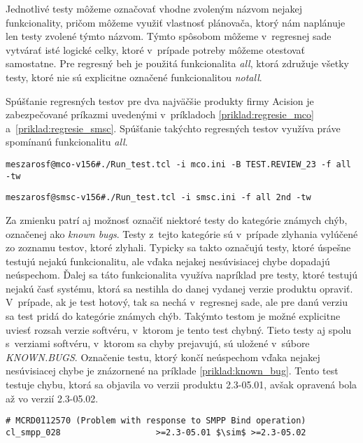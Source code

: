 Jednotlivé testy môžeme označovať vhodne zvoleným názvom nejakej 
funkcionality, pričom môžeme využiť vlastnosť plánovača, ktorý nám 
naplánuje len testy zvolené týmto názvom. Týmto spôsobom môžeme 
v~regresnej sade vytvárať isté logické celky, ktoré v~prípade potreby 
môžeme otestovať samostatne. Pre regresný beh je použitá funkcionalita 
\emph{all}, ktorá združuje všetky testy, ktoré nie sú explicitne označené 
funkcionalitou \emph{notall}. 

Spúšťanie regresných testov pre dva najväčšie produkty firmy Acision 
je zabezpečované príkazmi uvedenými v~príkladoch \ref{priklad:regresie_mco}
a~\ref{priklad:regresie_smsc}. Spúšťanie takýchto regresných testov využíva
práve spomínanú funkcionalitu \emph{all}.

\begin{lstlisting}[caption=Spúšťanie regresných testov v~produkte MCO
,label=priklad:regresie_mco]
meszarosf@mco-v156#./Run_test.tcl -i mco.ini -B TEST.REVIEW_23 -f all -tw
\end{lstlisting}

\begin{lstlisting}[caption=Spúšťanie regresných testov v~produkte SMSCv5
,label=priklad:regresie_smsc]
meszarosf@smsc-v156#./Run_test.tcl -i smsc.ini -f all 2nd -tw
\end{lstlisting}

Za zmienku patrí aj možnosť označiť niektoré testy do kategórie 
známych chýb, označenej ako \emph{known bugs}. 
Testy z~tejto kategórie sú v~prípade zlyhania vylúčené zo zoznamu 
testov, ktoré zlyhali.
Typicky sa takto označujú testy, ktoré úspešne testujú nejakú 
funkcionalitu, ale vďaka nejakej nesúvisiacej chybe 
dopadajú neúspechom. Ďalej sa táto funkcionalita využíva napríklad pre 
testy, ktoré testujú nejakú časť systému, ktorá sa nestihla do danej 
vydanej verzie produktu opraviť. V~prípade, ak je test hotový, tak sa 
nechá v~regresnej sade, ale pre danú verziu sa test pridá do kategórie 
známych chýb.
Takýmto testom je možné explicitne uviesť rozsah verzie softvéru, 
v~ktorom je tento test chybný. Tieto testy aj spolu s~verziami softvéru, 
v~ktorom sa chyby prejavujú, sú uložené v~súbore \emph{KNOWN.BUGS}.
Označenie testu, ktorý končí neúspechom vďaka nejakej 
nesúvisiacej chybe je znázornené na príklade \ref{priklad:known_bug}.
Tento test testuje chybu, ktorá sa objavila vo verzii produktu 2.3-05.01, 
avšak opravená bola až vo verzií 2.3-05.02. 

\begin{lstlisting}[mathescape,caption=Príklad testu ktorý končí neúspechom pre verziu softvéru 2.3-05.01,
label=priklad:known_bug]
# MCRD0112570 (Problem with response to SMPP Bind operation)
cl_smpp_028                   >=2.3-05.01 $\sim$ >=2.3-05.02
\end{lstlisting}

